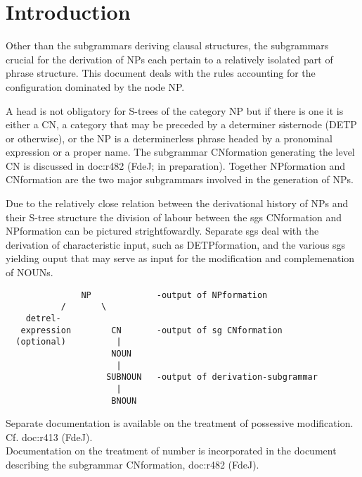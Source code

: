 
   \RosSupersedes{}
   \MakeRosTitle
%
%


\section{Introduction}

Other than the subgrammars deriving clausal structures, 
the subgrammars crucial for the derivation of NPs
each pertain to a relatively isolated part of phrase structure.
This document deals with the rules accounting for the 
configuration dominated by the node NP.

A head is not obligatory for S-trees of the category NP 
but if there is one it is either a CN, a category that may be preceded by 
a determiner sisternode (DETP or otherwise), or the NP is a determinerless 
phrase headed by a pronominal expression or a proper name. 
The subgrammar CNformation generating the level CN is discussed in 
doc:r482 (FdeJ; in 
preparation).  
Together NPformation and CNformation
are the two major subgrammars involved in the generation of NPs.

Due to the relatively close relation between the derivational 
history of NPs and their S-tree structure
the division of labour between the sgs CNformation and NPformation 
can be pictured strightfowardly. Separate sgs deal with the derivation of 
characteristic input, such as DETPformation, and the various sgs yielding
ouput that may serve as input for the modification and complemenation of 
NOUNs.\\


\begin{verbatim}
               NP             -output of NPformation
           /       \
    detrel-
   expression        CN       -output of sg CNformation
  (optional)          |
                     NOUN
                      |
                    SUBNOUN   -output of derivation-subgrammar
                      |
                     BNOUN
\end{verbatim}

\noindent
Separate documentation is available on the treatment of 
possessive modification. Cf. doc:r413 (FdeJ).\\
Documentation on the treatment of number is incorporated 
in the document describing the subgrammar CNformation, doc:r482 (FdeJ).

